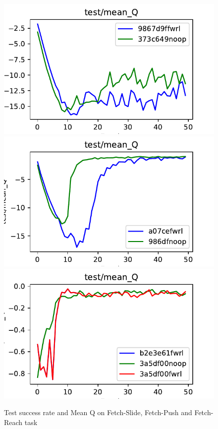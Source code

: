 \begin{figure}
  \def\frac{0.32}
    \includegraphics[width=\frac\columnwidth]{media/res/373c649_FetchSlide-v1-noop/test/mean_Q.pdf}%
    \includegraphics[width=\frac\columnwidth]{media/res/a077c9e_FetchPush-v1-fwrl/test/mean_Q.pdf}%
    \includegraphics[width=\frac\columnwidth]{media/res/3a5df00_FetchReach-v1-fwrl/test/mean_Q.pdf}
    \caption{Test success rate and Mean Q on Fetch-Slide, Fetch-Push and Fetch-Reach task}
    \label{fig:fetch-slide-success}
\end{figure}


